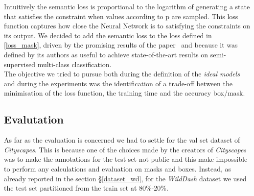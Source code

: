 \documentclass[10pt,twocolumn,letterpaper]{article}
\begin{document}
\noindent
Intuitively the semantic loss is proportional to the logarithm of generating a state that satisfies the constraint when values according to p are sampled. This loss function captures how close the Neural Network is to satisfying the constraints on its output. We decided to add the semantic loss to the loss defined in \ref{loss_mask}, driven by the promising results of the paper~\cite{Authors2_BlendMask} and because it was defined by its authors as useful to achieve state-of-the-art results on semi-supervised multi-class classification. \\
The objective we tried to pursue both during the definition of the \textit{ideal models} and during the experiments was the identification of a trade-off between the minimisation of the loss function, the training time and the accuracy box/mask.
\subsection{Evalutation}
As far as the evaluation is concerned we had to settle for the val set dataset of \textit{Cityscapes}. 
This is because one of the choices made by the creators of \textit{Cityscapes}~\cite{cityscapes} was to make the annotations for the test set not public and this make impossible to perform any calculations and evaluation on masks and boxes. Instead, as already reported in the section \S\ref{dataset_wd}, for the \textit{WildDash} dataset we used the test set partitioned from the train set at 80\%-20\%.
\end{document}
